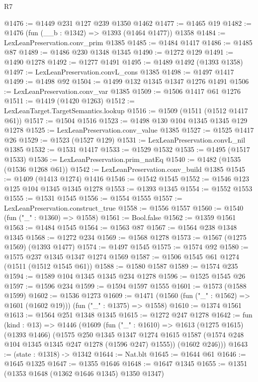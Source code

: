 \begin{lexlean}{R7}
\begin{coremodule}
@1476 := @1449 @231 @127 @239 @1350 @1462
@1477 := @1465 @19
@1482 := @1476 (fun (__b : @1342) => @1393 (@1464 @1477)) @1358
@1484 := LexLeanPreservation.conv_prim @1385
@1485 := @1484 @1417
@1486 := @1485 @87
@1489 := @1486 @230 @1348 @1345
@1490 := @1272 @129
@1491 := @1490 @1278
@1492 := @1277 @1491
@1495 := @1489 @1492 (@1393 @1358)
@1497 := LexLeanPreservation.convL_cons @1385
@1498 := @1497 @1417
@1499 := @1498 @92
@1504 := @1499 @132 @1345 @1347 @1276 @1491
@1506 := LexLeanPreservation.conv_var @1385
@1509 := @1506 @1417 @61 @1276
@1511 := @1419 (@1420 @1263)
@1512 := LexLeanTarget.TargetSemantics.lookup
@1516 := @1509 (@1511 (@1512 @1417 @61))
@1517 := @1504 @1516
@1523 := @1498 @130 @104 @1345 @1345 @129 @1278
@1525 := LexLeanPreservation.conv_value @1385
@1527 := @1525 @1417 @26
@1529 := @1523 (@1527 @129)
@1531 := LexLeanPreservation.convL_nil @1385
@1532 := @1531 @1417
@1533 := @1529 @1532
@1535 := @1495 (@1517 @1533)
@1536 := LexLeanPreservation.prim_natEq
@1540 := @1482 (@1535 (@1536 @1268 @61))
@1542 := LexLeanPreservation.conv_build @1385
@1545 := @1409 (@1413 @1274) @1416
@1546 := @1542 @1545
@1552 := @1546 @123 @125 @104 @1345 @1345 @1278
@1553 := @1393 @1345
@1554 := @1552 @1553
@1555 := @1531 @1545
@1556 := @1554 @1555
@1557 := LexLeanPreservation.construct_true
@1558 := @1556 @1557
@1560 := @1540 (fun ("_" : @1360) => @1558)
@1561 := Bool.false
@1562 := @1359 @1561
@1563 := @1484 @1545
@1564 := @1563 @87
@1567 := @1564 @238 @1348 @1345
@1568 := @1272 @234
@1569 := @1568 @1278
@1573 := @1567 (@1275 @1569) (@1393 @1477)
@1574 := @1497 @1545
@1575 := @1574 @92
@1580 := @1575 @237 @1345 @1347 @1274 @1569
@1587 := @1506 @1545 @61 @1274 (@1511 (@1512 @1545 @61))
@1588 := @1580 @1587
@1589 := @1574 @235
@1594 := @1589 @104 @1345 @1345 @234 @1278
@1596 := @1525 @1545 @26
@1597 := @1596 @234
@1599 := @1594 @1597 @1555
@1601 := @1573 (@1588 @1599)
@1602 := @1536 @1273
@1609 := @1471 (@1560 (fun ("_" : @1562) => @1601 (@1602 @19))) (fun ("_" : @1375) => @1558)
@1610 := @1374 @1561
@1613 := @1564 @251 @1348 @1345
@1615 := @1272 @247 @1278
@1642 := fun (kind : @13) =>
  @1446
    (@1609
      (fun ("_" : @1610) =>
      @1613
        (@1275 @1615)
        (@1393 @1466)
        (@1575
          @250
          @1345
          @1347
          @1274
          @1615
          @1587
          (@1574 @248 @104 @1345 @1345 @247 @1278 (@1596 @247) @1555))
        (@1602 @246)))
@1643 := (state : @1318) -> @1342
@1644 := Nat.blt
@1645 := @1644 @61
@1646 := @1645 @1325
@1647 := @1355 @1646
@1648 := @1647 @1345
@1655 := @1351 (@1353 @1648 (@1362 @1646 @1345) @1350 @1347)

\end{coremodule}
\end{lexlean}
